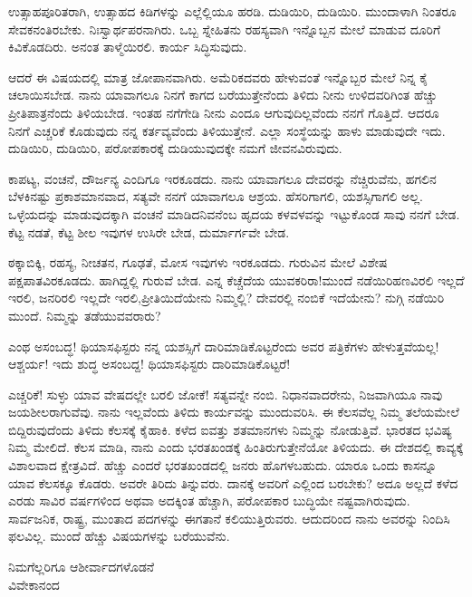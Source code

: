 ಉತ್ಸಾಹಪೂರಿತರಾಗಿ, ಉತ್ಸಾಹದ ಕಿಡಿಗಳನ್ನು ಎಲ್ಲೆಲ್ಲಿಯೂ ಹರಡಿ. ದುಡಿಯಿರಿ, ದುಡಿಯಿರಿ. ಮುಂದಾಳಾಗಿ ನಿಂತರೂ ಸೇವಕನಂತಿರಬೇಕು. ನಿಃಸ್ವಾರ್ಥಪರನಾಗಿರು. ಒಬ್ಬ ಸ್ನೇಹಿತನು ರಹಸ್ಯವಾಗಿ ಇನ್ನೊಬ್ಬನ ಮೇಲೆ ಮಾಡುವ ದೂರಿಗೆ ಕಿವಿಕೊಡದಿರು. ಅನಂತ ತಾಳ್ಮೆಯಿರಲಿ. ಕಾರ್ಯ ಸಿದ್ಧಿಸುವುದು.

ಆದರೆ ಈ ವಿಷಯದಲ್ಲಿ ಮಾತ್ರ ಜೋಪಾನವಾಗಿರು. ಅಮೆರಿಕದವರು ಹೇಳುವಂತೆ ಇನ್ನೊಬ್ಬರ ಮೇಲೆ ನಿನ್ನ ಕೈ ಚಲಾಯಿಸಬೇಡ. ನಾನು ಯಾವಾಗಲೂ ನಿನಗೆ ಕಾಗದ ಬರೆಯುತ್ತೇನೆಂದು ತಿಳಿದು ನೀನು ಉಳಿದವರಿಗಿಂತ ಹೆಚ್ಚು ಪ್ರೀತಿಪಾತ್ರನೆಂದು ತಿಳಿಯಬೇಡ. ಇಂತಹ ನಗೆಗೇಡಿ ನೀನು ಎಂದೂ ಆಗುವುದಿಲ್ಲವೆಂದು ನನಗೆ ಗೊತ್ತಿದೆ. ಆದರೂ ನಿನಗೆ ಎಚ್ಚರಿಕೆ ಕೊಡುವುದು ನನ್ನ ಕರ್ತವ್ಯವೆಂದು ತಿಳಿಯುತ್ತೇನೆ. ಎಲ್ಲಾ ಸಂಸ್ಥೆಯನ್ನು ಹಾಳು ಮಾಡುವುದೇ ಇದು. ದುಡಿಯಿರಿ, ದುಡಿಯಿರಿ, ಪರೋಪಕಾರಕ್ಕೆ ದುಡಿಯುವುದಕ್ಕೇ ನಮಗೆ ಜೀವನವಿರುವುದು.

ಕಾಪಟ್ಯ, ವಂಚನೆ, ದೌರ್ಜನ್ಯ ಎಂದಿಗೂ ಇರಕೂಡದು. ನಾನು ಯಾವಾಗಲೂ ದೇವರನ್ನು ನೆಚ್ಚಿರುವೆನು, ಹಗಲಿನ ಬೆಳಕಿನಷ್ಟು ಪ್ರಕಾಶಮಾನವಾದ, ಸತ್ಯವೇ ನನಗೆ ಯಾವಾಗಲೂ ಆಶ್ರಯ. ಹೆಸರಿಗಾಗಲಿ, ಯಶಸ್ಸಿಗಾಗಲಿ ಅಲ್ಲ. ಒಳ್ಳೆಯದನ್ನು ಮಾಡುವುದಕ್ಕಾಗಿ ವಂಚನೆ ಮಾಡಿದನಿವನೆಂಬ ಹೃದಯ ಕಳವಳವನ್ನು ಇಟ್ಟುಕೊಂಡ ಸಾವು ನನಗೆ ಬೇಡ. ಕೆಟ್ಟ ನಡತೆ, ಕೆಟ್ಟ ಶೀಲ ಇವುಗಳ ಉಸಿರೇ ಬೇಡ, ದುರ್ಮಾರ್ಗವೇ ಬೇಡ.

ಠಕ್ಕಾಬಿಕ್ಕಿ, ರಹಸ್ಯ, ನೀಚತನ, ಗೂಢತೆ, ಮೋಸ ಇವುಗಳು ಇರಕೂಡದು. ಗುರುವಿನ ಮೇಲೆ ವಿಶೇಷ ಪಕ್ಷಪಾತವಿರಕೂಡದು. ಹಾಗಿದ್ದಲ್ಲಿ ಗುರುವೆ ಬೇಡ. ಎನ್ನ ಕೆಚ್ಚೆದೆಯ ಯುವಕರಿರಾ!ಮುಂದೆ ನಡೆಯಿರಿ\enginline{-}ಹಣವಿರಲಿ ಇಲ್ಲದೆ ಇರಲಿ, ಜನರಿರಲಿ ಇಲ್ಲದೇ ಇರಲಿ,\newpage\noindent ಪ್ರೀತಿಯಿದೆಯೇನು ನಿಮ್ಮಲ್ಲಿ? ದೇವರಲ್ಲಿ ನಂಬಿಕೆ ಇದೆಯೇನು? ನುಗ್ಗಿ ನಡೆಯಿರಿ ಮುಂದೆ. ನಿಮ್ಮನ್ನು ತಡೆಯುವವರಾರು?

ಎಂಥ ಅಸಂಬದ್ಧ! ಥಿಯಾಸಫಿಸ್ಟರು ನನ್ನ ಯಶಸ್ಸಿಗೆ ದಾರಿಮಾಡಿಕೊಟ್ಟರೆಂದು ಅವರ ಪತ್ರಿಕೆಗಳು ಹೇಳುತ್ತವೆಯಲ್ಲ! ಆಶ್ಚರ್ಯ! ಇದು ಶುದ್ಧ ಅಸಂಬದ್ದ! ಥಿಯಾಸಫಿಸ್ಟರು ದಾರಿಮಾಡಿಕೊಟ್ಟರೆ!

ಎಚ್ಚರಿಕೆ! ಸುಳ್ಳು ಯಾವ ವೇಷದಲ್ಲೇ ಬರಲಿ ಜೋಕೆ! ಸತ್ಯವನ್ನೇ ನಂಬಿ. ನಿಧಾನವಾದರೇನು, ನಿಜವಾಗಿಯೂ ನಾವು ಜಯಶೀಲರಾಗುವೆವು. ನಾನು ಇಲ್ಲವೆಂದು ತಿಳಿದು ಕಾರ್ಯವನ್ನು ಮುಂದುವರಿಸಿ. ಈ ಕೆಲಸವೆಲ್ಲ ನಿಮ್ಮ ತಲೆಯಮೇಲೆ ಬಿದ್ದಿರುವುದೆಂದು ತಿಳಿದು ಕೆಲಸಕ್ಕೆ ಕೈಹಾಕಿ. ಕಳೆದ ಐವತ್ತು ಶತಮಾನಗಳು ನಿಮ್ಮನ್ನು ನೋಡುತ್ತಿವೆ. ಭಾರತದ ಭವಿಷ್ಯ ನಿಮ್ಮ ಮೇಲಿದೆ. ಕೆಲಸ ಮಾಡಿ, ನಾನು ಎಂದು ಭರತಖಂಡಕ್ಕೆ ಹಿಂತಿರುಗುತ್ತೇನೆಯೋ ತಿಳಿಯದು. ಈ ದೇಶದಲ್ಲಿ ಕಾವ್ಯಕ್ಕೆ ವಿಶಾಲವಾದ ಕ್ಷೇತ್ರವಿದೆ. ಹೆಚ್ಚು ಎಂದರೆ ಭರತಖಂಡದಲ್ಲಿ ಜನರು ಹೊಗಳಬಹುದು. ಯಾರೂ ಒಂದು ಕಾಸನ್ನೂ ಯಾವ ಕೆಲಸಕ್ಕೂ ಕೊಡರು. ಅವರೇ ತಿರಿದು ತಿನ್ನುವರು. ದಾನಕ್ಕೆ ಅವರಿಗೆ ಎಲ್ಲಿಂದ ಬರಬೇಕು? ಅದೂ ಅಲ್ಲದೆ ಕಳೆದ ಎರಡು ಸಾವಿರ ವರ್ಷಗಳಿಂದ ಅಥವಾ ಅದಕ್ಕಿಂತ ಹೆಚ್ಚಾಗಿ, ಪರೋಪಕಾರ ಬುದ್ಧಿಯೇ ನಷ್ಟವಾಗಿರುವುದು. ಸಾರ್ವಜನಿಕ, ರಾಷ್ಟ್ರ, ಮುಂತಾದ ಪದಗಳನ್ನು ಈಗತಾನೆ ಕಲಿಯುತ್ತಿರುವರು. ಆದುದರಿಂದ ನಾನು ಅವರನ್ನು ನಿಂದಿಸಿ ಫಲವಿಲ್ಲ. ಮುಂದೆ ಹೆಚ್ಚು ವಿಷಯಗಳನ್ನು ಬರೆಯುವೆನು.
\vspace{-0.3cm}

{\flushright
ನಿಮಗೆಲ್ಲರಿಗೂ ಆಶೀರ್ವಾದಗಳೊಡನೆ\\ವಿವೇಕಾನಂದ\par}
\vspace{-0.3cm}

